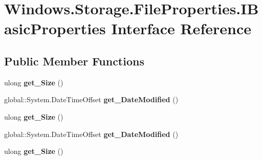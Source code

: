 \hypertarget{interface_windows_1_1_storage_1_1_file_properties_1_1_i_basic_properties}{}\section{Windows.\+Storage.\+File\+Properties.\+I\+Basic\+Properties Interface Reference}
\label{interface_windows_1_1_storage_1_1_file_properties_1_1_i_basic_properties}
\subsection*{Public Member Functions}
\begin{DoxyCompactItemize}
\item 
\mbox{\label{interface_windows_1_1_storage_1_1_file_properties_1_1_i_basic_properties_a9443d5267265836584c72d9269eefc66}} 
ulong {\bfseries get\+\_\+\+Size} ()
\item 
\mbox{\label{interface_windows_1_1_storage_1_1_file_properties_1_1_i_basic_properties_aa691483ff8606b83e9f1f568782ef91a}} 
global\+::\+System.\+Date\+Time\+Offset {\bfseries get\+\_\+\+Date\+Modified} ()
\item 
\mbox{\label{interface_windows_1_1_storage_1_1_file_properties_1_1_i_basic_properties_a9443d5267265836584c72d9269eefc66}} 
ulong {\bfseries get\+\_\+\+Size} ()
\item 
\mbox{\label{interface_windows_1_1_storage_1_1_file_properties_1_1_i_basic_properties_aa691483ff8606b83e9f1f568782ef91a}} 
global\+::\+System.\+Date\+Time\+Offset {\bfseries get\+\_\+\+Date\+Modified} ()
\item 
\mbox{\label{interface_windows_1_1_storage_1_1_file_properties_1_1_i_basic_properties_a9443d5267265836584c72d9269eefc66}} 
ulong {\bfseries get\+\_\+\+Size} ()
\item 
\mbox{\label{interface_windows_1_1_storage_1_1_file_properties_1_1_i_basic_properties_aa691483ff8606b83e9f1f568782ef91a}} 

\end{DoxyCompactItemize}

